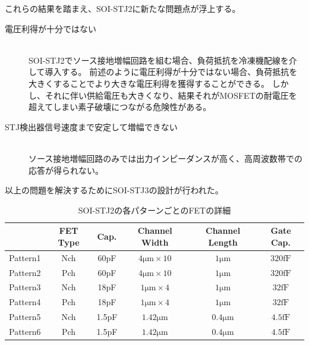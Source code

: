 		これらの結果を踏まえ、SOI-STJ2に新たな問題点が浮上する。
		\begin{description}
			\item[電圧利得が十分ではない]\mbox{}\\
				SOI-STJ2でソース接地増幅回路を組む場合、負荷抵抗を冷凍機配線を介して導入する。
				前述のように電圧利得が十分ではない場合、負荷抵抗を大きくすることでより大きな電圧利得を獲得することができる。
				しかし、それに伴い供給電圧も大きくなり、結果それがMOSFETの耐電圧を超えてしまい素子破壊につながる危険性がある。
			\item[STJ検出器信号速度まで安定して増幅できない]\mbox{}\\
				ソース接地増幅回路のみでは出力インピーダンスが高く、高周波数帯での応答が得られない。
		\end{description}
		
		以上の問題を解決するためにSOI-STJ3の設計が行われた。
		\begin{table}[htb]
			\begin{center}
				\begin{tabular}{| c || c | c | c | c | c |} \hline
					\  & FET Type & Cap. & Channel Width & Channel Length & Gate Cap. \\ \hline \hline
					Pattern1 & Nch & 60pF & $4\mathrm{\mu m} \times 10$ & $1 \mathrm{\mu m}$ & $320 \mathrm{fF}$ \\ \hline
					Pattern2 & Pch & 60pF & $4\mathrm{\mu m} \times 10$ & $1 \mathrm{\mu m}$ & $320 \mathrm{fF}$ \\ \hline
					Pattern3 & Nch & 18pF & $1\mathrm{\mu m} \times 4$ & $1 \mathrm{\mu m}$ & $32 \mathrm{fF}$ \\ \hline
					Pattern4 & Pch & 18pF & $1\mathrm{\mu m} \times 4$ & $1 \mathrm{\mu m}$ & $32 \mathrm{fF}$ \\ \hline
					Pattern5 & Nch & 1.5pF & $1.42\mathrm{\mu m}$ & $0.4 \mathrm{\mu m}$ & $4.5 \mathrm{fF}$ \\ \hline
					Pattern6 & Pch & 1.5pF & $1.42\mathrm{\mu m}$ & $0.4 \mathrm{\mu m}$ & $4.5 \mathrm{fF}$ \\ \hline
				\end{tabular}
				\caption{SOI-STJ2の各パターンごとのFETの詳細}
				\label{tab:SOISTJ2_detail}
			\end{center}
		\end{table}
		\clearpage
